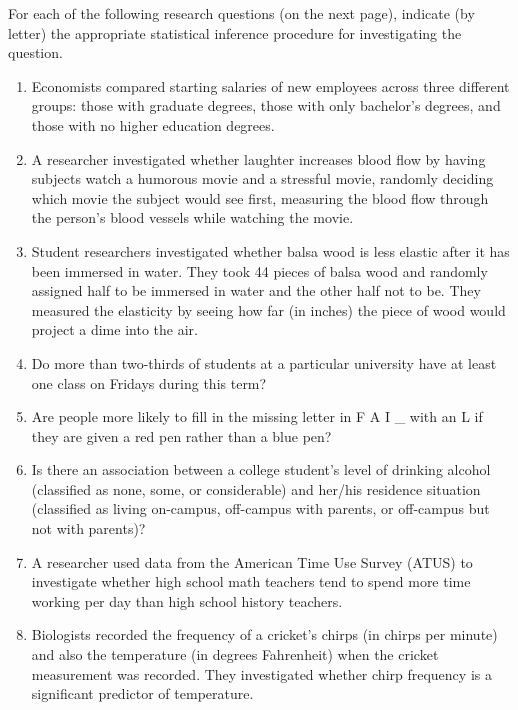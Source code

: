 For each of the following research questions (on the next page), indicate (by letter) the appropriate statistical inference procedure for investigating the question.
\begin{enumerate} [leftmargin=1cm, itemsep=.2em]
\item Economists compared starting salaries of new employees across three different groups: those with graduate degrees, those with only bachelor's degrees, and those with no higher education degrees.

\item A researcher investigated whether laughter increases blood flow by having subjects watch a humorous movie and a stressful movie, randomly deciding which movie the subject would see first, measuring the blood flow through the person's blood vessels while watching the movie.

\item Student researchers investigated whether balsa wood is less elastic after it has been immersed in water.  They took 44 pieces of balsa wood and randomly assigned half to be immersed in water and the other half not to be.  They measured the elasticity by seeing how far (in inches) the piece of wood would project a dime into the air.

\item Do more than two-thirds of students at a particular university have at least one class on Fridays during this term?

\item Are people more likely to fill in the missing letter in F A I \_ with an L if they are given a red pen rather than a blue pen?

\item Is there an association between a college student's level of drinking alcohol (classified as none, some, or considerable) and her/his residence situation (classified as living on-campus, off-campus with parents, or off-campus but not with parents)?

\item A researcher used data from the American Time Use Survey (ATUS) to investigate whether high school math teachers tend to spend more time working per day than high school history teachers.

\item Biologists recorded the frequency of a cricket's chirps (in chirps per minute) and also the temperature (in degrees Fahrenheit) when the cricket measurement was recorded.  They investigated whether chirp frequency is a significant predictor of temperature.
\end{enumerate}
 

